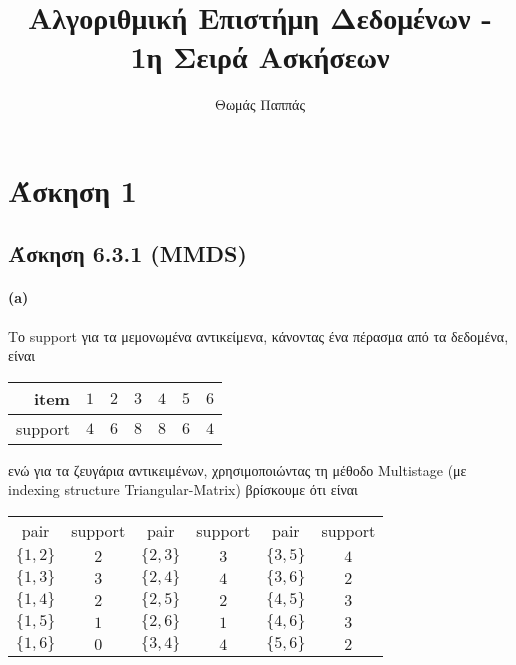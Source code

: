 \documentclass[a4paper,11pt]{article}
\begin{document}
\title{Αλγοριθμική Επιστήμη Δεδομένων - 1η Σειρά Ασκήσεων}
\author{Θωμάς Παππάς}
\maketitle

\section*{Άσκηση 1}

\subsection*{Άσκηση 6.3.1 (MMDS)}

\paragraph{(a)} Το support για τα μεμονωμένα αντικείμενα, κάνοντας ένα πέρασμα από τα δεδομένα, είναι
\begin{center}
	\begin{tabular}{| r || c | c | c | c | c | c |}
		\hline
		item & $1$ & $2$ & $3$ & $4$ & $5$ & $6$ \\ \hline
		support & $4$ & $6$ & $8$ & $8$ & $6$ & $4$ \\ \hline
	\end{tabular}
\end{center}

ενώ για τα ζευγάρια αντικειμένων, χρησιμοποιώντας τη μέθοδο Multistage (με indexing structure Triangular-Matrix) βρίσκουμε ότι είναι
\begin{center}
	\begin{tabular}{| c | c || c | c || c | c |}
		\hline
		pair & support & pair & support & pair & support \\ \hhline{|=|=#=|=#=|=|}
		$\{1,2\}$ & $2$ & $\{2,3\}$ & $3$ & $\{3,5\}$ & $4$ \\ \hline
		$\{1,3\}$ & $3$ & $\{2,4\}$ & $4$ & $\{3,6\}$ & $2$ \\ \hline
		$\{1,4\}$ & $2$ & $\{2,5\}$ & $2$ & $\{4,5\}$ & $3$ \\ \hline
		$\{1,5\}$ & $1$ & $\{2,6\}$ & $1$ & $\{4,6\}$ & $3$ \\ \hline
		$\{1,6\}$ & $0$ & $\{3,4\}$ & $4$ & $\{5,6\}$ & $2$ \\ \hline
	\end{tabular}
\end{center}
\end{document}
